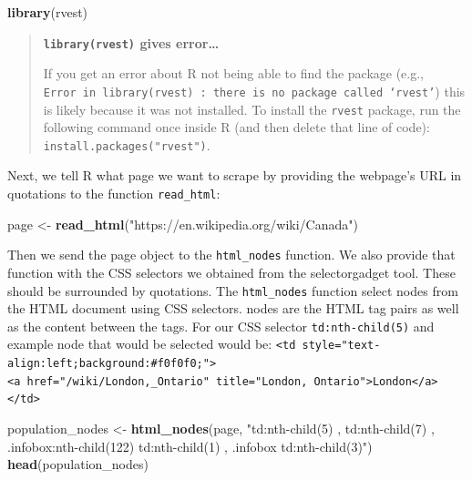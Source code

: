 \documentclass[
]{article}
\newenvironment{Shaded}{\begin{snugshade}}{\end{snugshade}}
\newcommand{\KeywordTok}[1]{\textcolor[rgb]{0.13,0.29,0.53}{\textbf{#1}}}
\newcommand{\NormalTok}[1]{#1}
\newcommand{\StringTok}[1]{\textcolor[rgb]{0.31,0.60,0.02}{#1}}
\begin{document}
\begin{Shaded}
\begin{Highlighting}[]
\KeywordTok{library}\NormalTok{(rvest)}
\end{Highlighting}
\end{Shaded}

\begin{quote}
\textbf{\texttt{library(rvest)} gives error\ldots{}}

If you get an error about R not being able to find the package (e.g.,
\texttt{Error\ in\ library(rvest)\ :\ there\ is\ no\ package\ called\ ‘rvest’})
this is likely because it was not installed. To install the
\texttt{rvest} package, run the following command once inside R (and
then delete that line of code): \texttt{install.packages("rvest")}.
\end{quote}

Next, we tell R what page we want to scrape by providing the webpage's
URL in quotations to the function \texttt{read\_html}:

\begin{Shaded}
\begin{Highlighting}[]
\NormalTok{page <{-}}\StringTok{ }\KeywordTok{read\_html}\NormalTok{(}\StringTok{"https://en.wikipedia.org/wiki/Canada"}\NormalTok{)}
\end{Highlighting}
\end{Shaded}

Then we send the page object to the \texttt{html\_nodes} function. We
also provide that function with the CSS selectors we obtained from the
selectorgadget tool. These should be surrounded by quotations. The
\texttt{html\_nodes} function select nodes from the HTML document using
CSS selectors. nodes are the HTML tag pairs as well as the content
between the tags. For our CSS selector \texttt{td:nth-child(5)} and
example node that would be selected would be:
\texttt{\textless{}td\ style="text-align:left;background:\#f0f0f0;"\textgreater{}\textless{}a\ href="/wiki/London,\_Ontario"\ title="London,\ Ontario"\textgreater{}London\textless{}/a\textgreater{}\textless{}/td\textgreater{}}

\begin{Shaded}
\begin{Highlighting}[]
\NormalTok{population\_nodes <{-}}\StringTok{ }\KeywordTok{html\_nodes}\NormalTok{(page, }\StringTok{"td:nth{-}child(5) , td:nth{-}child(7) , .infobox:nth{-}child(122) td:nth{-}child(1) , .infobox td:nth{-}child(3)"}\NormalTok{)}
\KeywordTok{head}\NormalTok{(population\_nodes)}
\end{Highlighting}
\end{Shaded}
\end{document}

